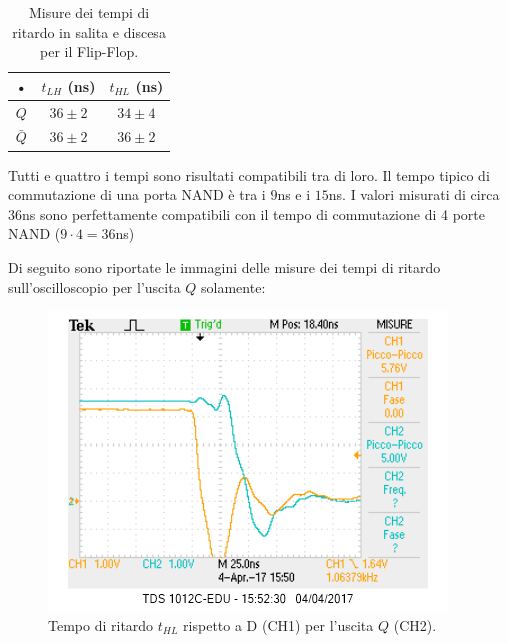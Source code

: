 \documentclass[10pt,a4paper]{article}
\begin{document}
\begin{table}[!htb]
\centering
\begin{tabular}{|c|c|c|}
\hline 
• & $t_{LH}$ (ns) & $t_{HL}$ (ns)\\
\hline
$Q$ & $36 \pm 2$ & $34 \pm 4$\\
\hline
$\bar{Q}$ & $36 \pm 2$ & $36 \pm 2$\\
\hline
\end{tabular}
\caption{Misure dei tempi di ritardo in salita e discesa per il Flip-Flop.\label{ritardo}}
\end{table}

Tutti e quattro i tempi sono risultati compatibili tra di loro. Il tempo tipico di commutazione di una porta NAND è tra i $9$ns e i $15$ns. I valori misurati di circa $36$ns sono perfettamente compatibili con il tempo di commutazione di 4 porte NAND ($9 \cdot 4 = 36$ns)%

Di seguito sono riportate le immagini delle misure dei tempi di ritardo sull'oscilloscopio per l'uscita $Q$ solamente:\\

\begin{figure}
\centering
\includegraphics[scale=1.0]{tphlQ.png}
\caption{Tempo di ritardo  $t_{HL}$ rispetto a D (CH1) per l'uscita $Q$ (CH2).\label{q1}}
\end{figure}
\end{document}

